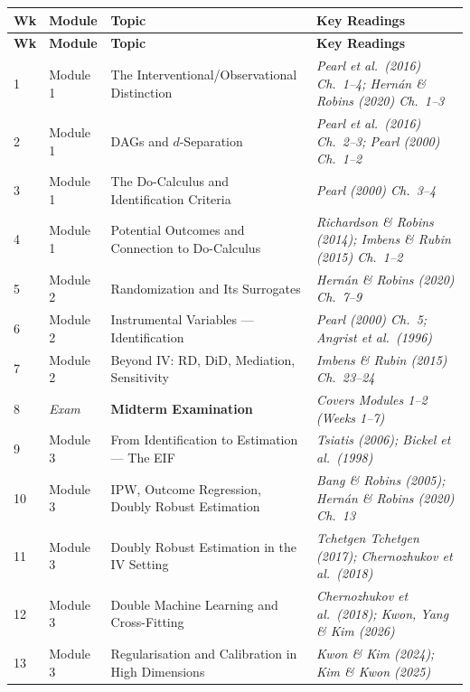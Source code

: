 \documentclass[12pt]{article}
\begin{document}
\begin{longtable}{C{0.6cm} L{1.5cm} L{5.5cm} L{5.8cm}}
  \toprule
  \color{white}\textbf{Wk} &
  \color{white}\textbf{Module} &
  \color{white}\textbf{Topic} &
  \color{white}\textbf{Key Readings} \\
  \midrule
  \endfirsthead
  \toprule
  \color{white}\textbf{Wk} &
  \color{white}\textbf{Module} &
  \color{white}\textbf{Topic} &
  \color{white}\textbf{Key Readings} \\
  \midrule
  \endhead
  \bottomrule
  \endfoot

  1 & Module 1 & The Interventional/Observational Distinction
    & \textit{Pearl et al.\ (2016) Ch.~1--4;
              Hern\'an \& Robins (2020) Ch.~1--3} \\
  2 & Module 1 & DAGs and $d$-Separation
    & \textit{Pearl et al.\ (2016) Ch.~2--3;
              Pearl (2000) Ch.~1--2} \\
  3 & Module 1 & The Do-Calculus and Identification Criteria
    & \textit{Pearl (2000) Ch.~3--4} \\
  4 & Module 1 & Potential Outcomes and Connection to Do-Calculus
    & \textit{Richardson \& Robins (2014);
              Imbens \& Rubin (2015) Ch.~1--2} \\
  \midrule

  5 & Module 2 & Randomization and Its Surrogates
    & \textit{Hern\'an \& Robins (2020) Ch.~7--9} \\
  6 & Module 2 & Instrumental Variables --- Identification
    & \textit{Pearl (2000) Ch.~5; Angrist et al.\ (1996)} \\
  7 & Module 2 & Beyond IV: RD, DiD, Mediation, Sensitivity
    & \textit{Imbens \& Rubin (2015) Ch.~23--24} \\
  \midrule

  8 & \textit{Exam} & \textbf{Midterm Examination}
    & \textit{Covers Modules 1--2 (Weeks 1--7)} \\
  \midrule

  9 & Module 3 & From Identification to Estimation --- The EIF
    & \textit{Tsiatis (2006); Bickel et al.\ (1998)} \\
  10 & Module 3 & IPW, Outcome Regression, Doubly Robust Estimation
    & \textit{Bang \& Robins (2005);
              Hern\'an \& Robins (2020) Ch.~13} \\
  11 & Module 3 & Doubly Robust Estimation in the IV Setting
    & \textit{Tchetgen Tchetgen (2017);
              Chernozhukov et al.\ (2018)} \\
  12 & Module 3 & Double Machine Learning and Cross-Fitting
    & \textit{Chernozhukov et al.\ (2018);
              Kwon, Yang \& Kim (2026)} \\
  13 & Module 3 & Regularisation and Calibration in High Dimensions
    & \textit{Kwon \& Kim (2024); Kim \& Kwon (2025)} \\
  \midrule


\end{longtable}
\end{document}
